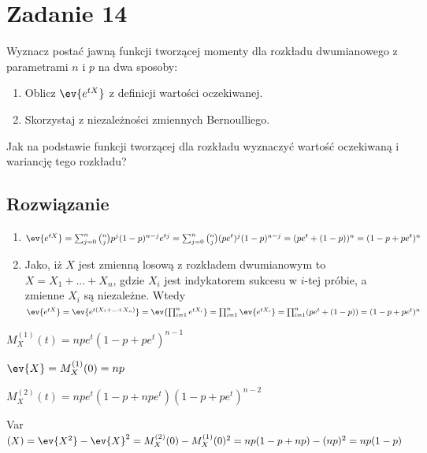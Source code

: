 \section{Zadanie 14}
Wyznacz postać jawną funkcji tworzącej momenty dla rozkładu dwumianowego z parametrami \(n\) i \(p\) na dwa sposoby:

\begin{enumerate}
	\item Oblicz \(\ev{e^{tX}}\) z definicji wartości oczekiwanej.
	\item Skorzystaj z niezależności zmiennych Bernoulliego.
\end{enumerate}

Jak na podstawie funkcji tworzącej dla rozkładu wyznaczyć wartość oczekiwaną i wariancję tego rozkładu?

\subsection*{Rozwiązanie}
\begin{enumerate}
	\item \(\ev{e^{tX}} = \sum_{j = 0}^{n} \binom{n}{j}p^j(1-p)^{n-j}e^{tj} = \sum_{j = 0}^{n} \binom{n}{j}(pe^t)^j(1-p)^{n-j} = (pe^t + (1 - p) )^n = (1 - p + pe^t)^n\)
	\item Jako, iż \(X\) jest zmienną losową z rozkładem dwumianowym to  \(X = X_1 + ... + X_n\), gdzie \(X_i\) jest indykatorem sukcesu w \(i\)-tej próbie, a zmienne \(X_i\) są niezależne. Wtedy \(\ev{e^{tX}} = \ev{e^{t(X_1 + ... + X_n)}} = \ev{\prod_{i = 1}^{n} e^{tX_i}} = \prod_{i = 1}^{n} \ev{e^{tX_i}} = \prod_{i = 1}^{n} (pe^{t} + (1-p)) = (1 - p + pe^{t})^n \)
\end{enumerate}

\(M_X^{(1)}(t) = npe^t(1 - p + pe^t)^{n-1}\)

\(\ev{X} = M_X^{(1)}(0) = np\)

\(M_X^{(2)}(t) = npe^t(1 - p + npe^t)(1 - p + pe^t)^{n-2}\)

Var\((X) = \ev{X^2} - \ev{X}^2 = M_X^{(2)}(0) - M_X^{(1)}(0)^2 = np(1- p + np) - (np)^2 = np(1-p)\)
